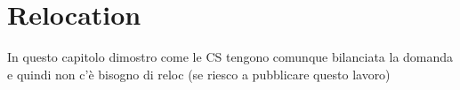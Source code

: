
\chapter{Relocation}
\label{chap:8_relocation}
	\graphicspath{{Chapter9/}}
In questo capitolo dimostro come le CS tengono comunque bilanciata la domanda e quindi non c'è bisogno di reloc (se riesco a pubblicare questo lavoro)




